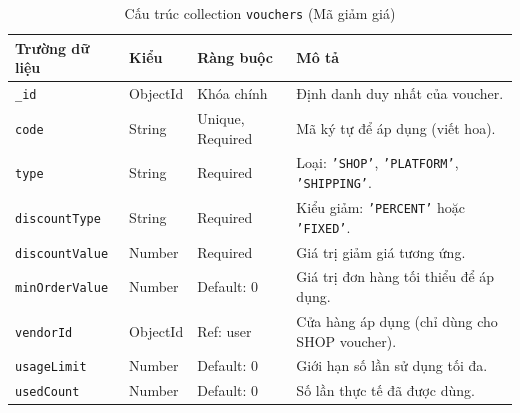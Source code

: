\documentclass[../DoAn.tex]{subfiles}
\begin{document}
\begin{table}[H]
    \centering
    \caption{Cấu trúc collection \texttt{vouchers} (Mã giảm giá)}
    \label{table:schema_voucher}
    \small
    \setlength{\tabcolsep}{3pt}
    \begin{tabular}{|>{\raggedright\arraybackslash}p{3.0cm}|>{\raggedright\arraybackslash}p{1.7cm}|>{\raggedright\arraybackslash}p{2.6cm}|>{\raggedright\arraybackslash}p{5.3cm}|}
        \hline
        \textbf{Trường dữ liệu} & \textbf{Kiểu} & \textbf{Ràng buộc} & \textbf{Mô tả} \\ \hline
        \texttt{\_id} & ObjectId & Khóa chính & Định danh duy nhất của voucher. \\ \hline
        \texttt{code} & String & Unique, Required & Mã ký tự để áp dụng (viết hoa). \\ \hline
        \texttt{type} & String & Required & Loại: \texttt{'SHOP'}, \texttt{'PLATFORM'}, \texttt{'SHIPPING'}. \\ \hline
        \texttt{discountType} & String & Required & Kiểu giảm: \texttt{'PERCENT'} hoặc \texttt{'FIXED'}. \\ \hline
        \texttt{discount}\allowbreak\texttt{Value} & Number & Required & Giá trị giảm giá tương ứng. \\ \hline
        \texttt{minOrder}\allowbreak\texttt{Value} & Number & Default: 0 & Giá trị đơn hàng tối thiểu để áp dụng. \\ \hline
        \texttt{vendorId} & ObjectId & Ref: user & Cửa hàng áp dụng (chỉ dùng cho SHOP voucher). \\ \hline
        \texttt{usageLimit} & Number & Default: 0 & Giới hạn số lần sử dụng tối đa. \\ \hline
        \texttt{usedCount} & Number & Default: 0 & Số lần thực tế đã được dùng. \\ \hline
    \end{tabular}
\end{table}
\end{document}
